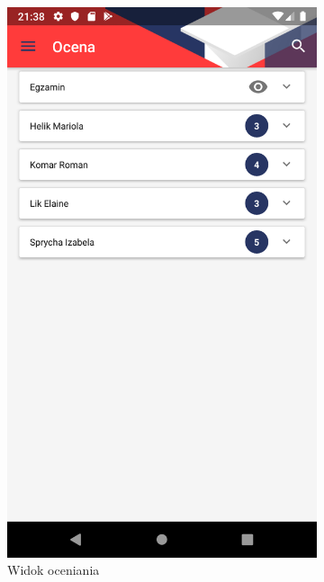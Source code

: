 \documentclass{pracamgr}
\begin{document}
\begin{figure}[p]
\begin{subfigure}[t]{0.3\textwidth}
		\includegraphics[width=\textwidth]{img/emptests_grading.png}
		\caption{Widok oceniania}
		\label{fig:emptests_grading}
	\end{subfigure}
	\quad
	\begin{subfigure}[t]{0.3\textwidth}

\end{subfigure}
\end{figure}
\end{document}
